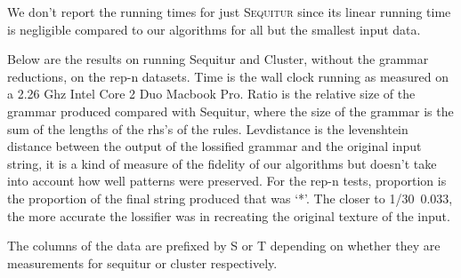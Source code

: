 \documentclass[11pt]{article}
\newcommand{\Sequitur}{\textsc{Sequitur}\xspace}
\begin{document}
We don't report the running times for just \Sequitur since its linear
running time is negligible compared to our algorithms for all but the
smallest input data.

Below are the results on running Sequitur and Cluster, without
the grammar reductions, on the rep-n datasets. Time is the wall clock
running as measured on a 2.26 Ghz Intel Core 2 Duo Macbook Pro.
Ratio is the relative size of the grammar produced compared with
Sequitur, where the size of the grammar is the sum of the lengths of the
rhs's of the rules. Levdistance is the levenshtein distance between
the output of the lossified grammar and the original input string, it
is a kind of measure of the fidelity of our algorithms but doesn't
take into account how well patterns were preserved. For the rep-n tests,
proportion is the proportion of the final string produced that was
`*'. The closer to 1/30~0.033, the more accurate the lossifier was
in recreating the original texture of the input.

The columns of the data are prefixed by S or T depending on whether
they are measurements for sequitur or cluster respectively.
\end{document}
